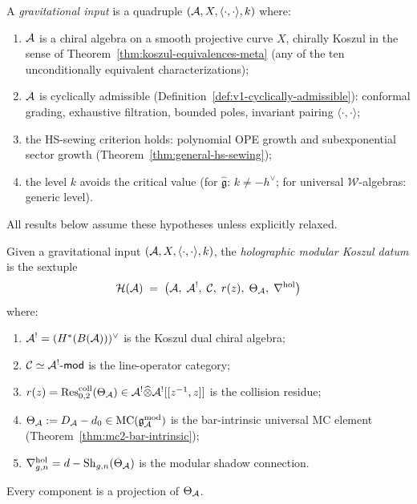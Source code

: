 \begin{definition}
\label{def:thqg-standing-hypotheses}
A \emph{gravitational input} is a quadruple $(\mathcal{A}, X, \langle\cdot,\cdot\rangle, k)$ where:
\begin{enumerate}[label=\textup{(\roman*)}]
\item $\mathcal{A}$ is a chiral algebra on a smooth projective curve $X$, chirally Koszul
 in the sense of Theorem~\ref{thm:koszul-equivalences-meta} (any of the ten
 unconditionally equivalent characterizations);
\item $\mathcal{A}$ is cyclically admissible
 (Definition~\ref{def:v1-cyclically-admissible}): conformal grading, exhaustive
 filtration, bounded poles, invariant pairing $\langle\cdot,\cdot\rangle$;
\item the HS-sewing criterion holds: polynomial OPE growth and
 subexponential sector growth (Theorem~\ref{thm:general-hs-sewing});
\item the level $k$ avoids the critical value (for $\widehat{\mathfrak{g}}$:
 $k \ne -h^\vee$; for universal $\mathcal{W}$-algebras: generic level).
\end{enumerate}
All results below assume these hypotheses unless explicitly relaxed.
\end{definition}

\begin{definition}
\label{def:thqg-holographic-datum}
Given a gravitational input $(\mathcal{A}, X, \langle\cdot,\cdot\rangle, k)$, the
\emph{holographic modular Koszul datum} is the sextuple
\begin{equation}\label{eq:thqg-holographic-datum}
\mathcal{H}(\mathcal{A}) \;=\; \bigl(\mathcal{A},\;\mathcal{A}^!,\;\mathcal{C},\;r(z),\;
\Theta_{\mathcal{A}},\;\nabla^{\mathrm{hol}}\bigr)
\end{equation}
where:
\begin{enumerate}[label=\textup{(\alph*)}]
\item $\mathcal{A}^! = (H^*(B(\mathcal{A})))^\vee$ is the Koszul dual chiral algebra;
\item $\mathcal{C} \simeq \mathcal{A}^!\text{-}\mathsf{mod}$ is the line-operator category;
\item $r(z) = \operatorname{Res}^{\mathrm{coll}}_{0,2}(\Theta_{\mathcal{A}}) \in
 \mathcal{A}^! \widehat{\otimes} \mathcal{A}^![[z^{-1},z]]$ is the collision residue;
\item $\Theta_{\mathcal{A}} := D_{\mathcal{A}} - d_0 \in \mathrm{MC}(\mathfrak{g}_{\mathcal{A}}^{\mathrm{mod}})$ is the bar-intrinsic universal
 MC element (Theorem~\ref{thm:mc2-bar-intrinsic});
\item $\nabla^{\mathrm{hol}}_{g,n} = d - \operatorname{Sh}_{g,n}(\Theta_{\mathcal{A}})$
 is the modular shadow connection.
\end{enumerate}
Every component is a projection of $\Theta_{\mathcal{A}}$.
\end{definition}

